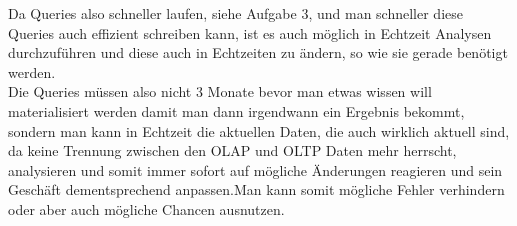Da Queries also schneller laufen, siehe Aufgabe 3, und man schneller diese Queries auch effizient schreiben kann, ist es auch möglich in Echtzeit Analysen durchzuführen und diese auch in Echtzeiten zu ändern, so wie sie gerade benötigt werden.
\\
Die Queries müssen also nicht 3 Monate bevor man etwas wissen will materialisiert werden damit man dann irgendwann ein Ergebnis bekommt, sondern man kann in Echtzeit die aktuellen Daten, die auch wirklich aktuell sind, da keine Trennung zwischen den OLAP und OLTP Daten mehr herrscht, analysieren und somit immer sofort auf mögliche Änderungen reagieren und sein Geschäft dementsprechend anpassen.Man kann somit mögliche Fehler verhindern oder aber auch mögliche Chancen ausnutzen. 
